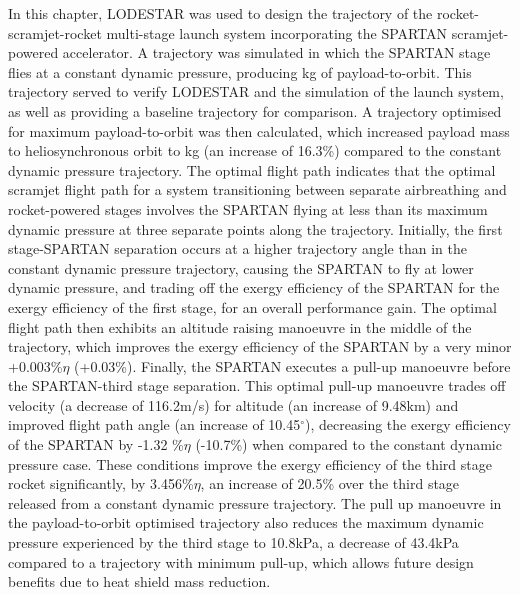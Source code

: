 In this chapter, LODESTAR was used to design the trajectory of the rocket-scramjet-rocket multi-stage launch system incorporating the SPARTAN scramjet-powered accelerator. 
A trajectory was simulated in which the SPARTAN stage flies at a constant dynamic pressure, producing \PayloadToOrbitConstq kg of payload-to-orbit. This trajectory served to verify LODESTAR and the simulation of  the launch system, as well as providing a baseline trajectory for comparison. 
A trajectory optimised for maximum payload-to-orbit was then calculated, which increased payload mass to heliosynchronous orbit to \PayloadToOrbitStandard kg (an increase of 16.3\%) compared to the constant dynamic pressure trajectory.
  The optimal flight path indicates that the optimal scramjet flight path for a system transitioning between separate airbreathing and rocket-powered stages involves the SPARTAN flying at less than its maximum dynamic pressure at three separate points along the trajectory. 
  Initially, the first stage-SPARTAN separation occurs at a higher trajectory angle than in the constant dynamic pressure trajectory, causing the SPARTAN to fly at lower dynamic pressure, and trading off the exergy efficiency of the SPARTAN for the exergy efficiency of the first stage, for an overall performance gain. 
  The optimal flight path then exhibits an altitude raising manoeuvre in the middle of the trajectory, which improves the exergy efficiency of the SPARTAN by a very minor +0.003\%$\eta$ (+0.03\%). 
  Finally, the SPARTAN executes a pull-up manoeuvre before the SPARTAN-third stage separation. This optimal pull-up manoeuvre trades off velocity (a decrease of 116.2m/s) for altitude (an increase of 9.48km) and improved flight path angle (an increase of 10.45$^\circ$), decreasing the exergy efficiency of the SPARTAN by -1.32 \%$\eta$ (-10.7\%) when compared to the constant dynamic pressure case. 
  These conditions improve the exergy efficiency of the third stage rocket significantly, by 3.456\%$\eta$, an increase of 20.5\% over the third stage released from a constant dynamic pressure trajectory. 
 The pull up manoeuvre in the payload-to-orbit optimised trajectory also reduces the maximum dynamic pressure experienced by the third stage to 10.8kPa, a decrease of 43.4kPa compared to a trajectory with minimum pull-up, which allows future design benefits due to heat shield mass reduction.  

